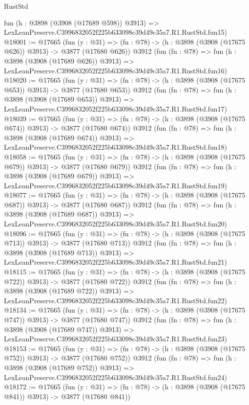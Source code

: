 \begin{lexlean}{RustStd}
\begin{coremodule}
    fun (h : @3898 (@3908 (@17689 @598)) @3913) =>
    LexLeanPreserve.C3996832052f225b633098c39d49c35a7.R1.RustStd.fun15)
@18001 := @17665
    (fun (y : @31) => (fn : @78) -> (h : @3898 (@3908 (@17675 @626)) @3913) -> @3877 (@17680 @626))
    @3912
    (fun (fn : @78) =>
    fun (h : @3898 (@3908 (@17689 @626)) @3913) =>
    LexLeanPreserve.C3996832052f225b633098c39d49c35a7.R1.RustStd.fun16)
@18020 := @17665
    (fun (y : @31) => (fn : @78) -> (h : @3898 (@3908 (@17675 @653)) @3913) -> @3877 (@17680 @653))
    @3912
    (fun (fn : @78) =>
    fun (h : @3898 (@3908 (@17689 @653)) @3913) =>
    LexLeanPreserve.C3996832052f225b633098c39d49c35a7.R1.RustStd.fun17)
@18039 := @17665
    (fun (y : @31) => (fn : @78) -> (h : @3898 (@3908 (@17675 @674)) @3913) -> @3877 (@17680 @674))
    @3912
    (fun (fn : @78) =>
    fun (h : @3898 (@3908 (@17689 @674)) @3913) =>
    LexLeanPreserve.C3996832052f225b633098c39d49c35a7.R1.RustStd.fun18)
@18058 := @17665
    (fun (y : @31) => (fn : @78) -> (h : @3898 (@3908 (@17675 @679)) @3913) -> @3877 (@17680 @679))
    @3912
    (fun (fn : @78) =>
    fun (h : @3898 (@3908 (@17689 @679)) @3913) =>
    LexLeanPreserve.C3996832052f225b633098c39d49c35a7.R1.RustStd.fun19)
@18077 := @17665
    (fun (y : @31) => (fn : @78) -> (h : @3898 (@3908 (@17675 @687)) @3913) -> @3877 (@17680 @687))
    @3912
    (fun (fn : @78) =>
    fun (h : @3898 (@3908 (@17689 @687)) @3913) =>
    LexLeanPreserve.C3996832052f225b633098c39d49c35a7.R1.RustStd.fun20)
@18096 := @17665
    (fun (y : @31) => (fn : @78) -> (h : @3898 (@3908 (@17675 @713)) @3913) -> @3877 (@17680 @713))
    @3912
    (fun (fn : @78) =>
    fun (h : @3898 (@3908 (@17689 @713)) @3913) =>
    LexLeanPreserve.C3996832052f225b633098c39d49c35a7.R1.RustStd.fun21)
@18115 := @17665
    (fun (y : @31) => (fn : @78) -> (h : @3898 (@3908 (@17675 @722)) @3913) -> @3877 (@17680 @722))
    @3912
    (fun (fn : @78) =>
    fun (h : @3898 (@3908 (@17689 @722)) @3913) =>
    LexLeanPreserve.C3996832052f225b633098c39d49c35a7.R1.RustStd.fun22)
@18134 := @17665
    (fun (y : @31) => (fn : @78) -> (h : @3898 (@3908 (@17675 @747)) @3913) -> @3877 (@17680 @747))
    @3912
    (fun (fn : @78) =>
    fun (h : @3898 (@3908 (@17689 @747)) @3913) =>
    LexLeanPreserve.C3996832052f225b633098c39d49c35a7.R1.RustStd.fun23)
@18153 := @17665
    (fun (y : @31) => (fn : @78) -> (h : @3898 (@3908 (@17675 @752)) @3913) -> @3877 (@17680 @752))
    @3912
    (fun (fn : @78) =>
    fun (h : @3898 (@3908 (@17689 @752)) @3913) =>
    LexLeanPreserve.C3996832052f225b633098c39d49c35a7.R1.RustStd.fun24)
@18172 := @17665
    (fun (y : @31) => (fn : @78) -> (h : @3898 (@3908 (@17675 @841)) @3913) -> @3877 (@17680 @841))

\end{coremodule}
\end{lexlean}

